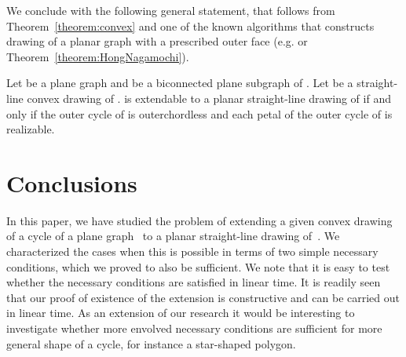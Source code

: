 \documentclass{llncs}
\begin{document}
We conclude with the following general statement, that follows from Theorem~\ref{theorem:convex} and one of the known algorithms that constructs drawing of a planar graph with a prescribed outer face (e.g. \cite{dgk-pdhgg-11,t-hdg-63} or Theorem~\ref{theorem:HongNagamochi}). 
\begin{corollary}
Let  be a plane graph and  be a biconnected plane subgraph of . Let  be a straight-line convex drawing of .  is extendable to a planar straight-line drawing of  if and only if the outer cycle of  is outerchordless and each petal of the outer cycle of  is realizable. 
\end{corollary}


\section{Conclusions}

In this paper, we have studied the problem of extending a given convex
drawing of a cycle of a plane graph~ to a planar straight-line
drawing of~.  We characterized the cases when this is possible in
terms of two simple necessary conditions, which we proved to also be
sufficient.  We note that it is easy to test whether the necessary
conditions are satisfied in linear time.  It is readily seen that our
proof of existence of the extension is constructive and can be carried
out in linear time.  As an extension of our research it would be interesting to investigate whether more 
envolved necessary conditions are sufficient for more general shape of a cycle, for instance a star-shaped polygon.



\end{document}
